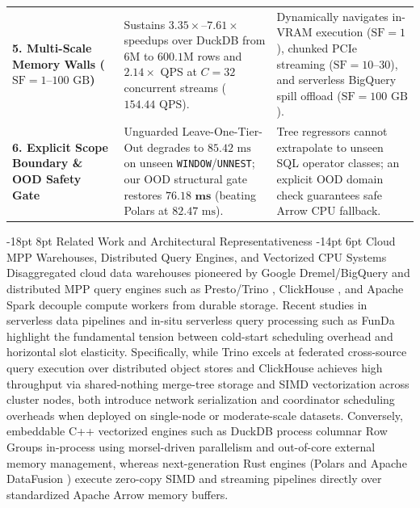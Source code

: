 \documentclass[10pt,a4paper]{article}
\makeatletter
\newenvironment{fitasttable}{%
  \begin{lrbox}{\asttblbox}%
}{%
  \end{lrbox}%
  \sbox{\asttblboxB}{%
    \ifdim\wd\asttblbox>0.96\textwidth
      \resizebox{0.96\textwidth}{!}{\usebox{\asttblbox}}%
    \else
      \usebox{\asttblbox}%
    \fi
  }%
  \ifdim\ht\asttblboxB>0.72\textheight
    \resizebox{!}{0.72\textheight}{\usebox{\asttblboxB}}%
  \else
    \usebox{\asttblboxB}%
  \fi
}
\renewcommand\section{\@startsection{section}{1}{\z@}%
  {-18pt \@plus -4pt \@minus -2pt}%
  {8pt \@plus 2pt}%
  {\normalfont\large\bfseries}}
\renewcommand\subsection{\@startsection{subsection}{2}{\z@}%
  {-14pt \@plus -3pt \@minus -1.5pt}%
  {6pt \@plus 1.5pt}%
  {\normalfont\normalsize\bfseries}}
\makeatother
\begin{document}
\begin{table}[!htbp]
{\begin{fitasttable}
\begin{tabular}{@{}p{2.9cm}p{5.3cm}p{6.8cm}@{}}
\textbf{5. Multi-Scale Memory Walls ($\text{SF}=1\text{--}100\text{ GB}$)} & Sustains $3.35\times\text{--}7.61\times$ speedups over DuckDB from $6\text{M}$ to $600.1\text{M}$ rows and $2.14\times$ QPS at $C=32$ concurrent streams ($154.44\text{ QPS}$). & Dynamically navigates in-VRAM execution ($\text{SF}=1$), chunked PCIe streaming ($\text{SF}=10\text{--}30$), and serverless BigQuery spill offload ($\text{SF}=100\text{ GB}$). \\
\textbf{6. Explicit Scope Boundary \& OOD Safety Gate} & Unguarded Leave-One-Tier-Out degrades to $85.42\text{ ms}$ on unseen \texttt{WINDOW}/\texttt{UNNEST}; our OOD structural gate restores $\mathbf{76.18\text{ ms}}$ (beating Polars at $82.47\text{ ms}$). & Tree regressors cannot extrapolate to unseen SQL operator classes; an explicit OOD domain check guarantees safe Arrow CPU fallback. \\
\bottomrule
\end{tabular}
\end{fitasttable}
}
\end{table}

\section{Related Work and Architectural Representativeness}
\subsection{Cloud MPP Warehouses, Distributed Query Engines, and Vectorized CPU Systems}
Disaggregated cloud data warehouses pioneered by Google Dremel/BigQuery \cite{melnik2010dremel, melnik2020dremel} and distributed MPP query engines such as Presto/Trino \cite{sethi2019presto}, ClickHouse \cite{schulze2024clickhouse}, and Apache Spark \cite{ahmed2020hibench} decouple compute workers from durable storage. Recent studies in serverless data pipelines \cite{shojaee2024serverless} and in-situ serverless query processing such as FunDa \cite{lounissi2025funda} highlight the fundamental tension between cold-start scheduling overhead and horizontal slot elasticity. Specifically, while Trino \cite{sethi2019presto} excels at federated cross-source query execution over distributed object stores and ClickHouse \cite{schulze2024clickhouse} achieves high throughput via shared-nothing merge-tree storage and SIMD vectorization across cluster nodes, both introduce network serialization and coordinator scheduling overheads when deployed on single-node or moderate-scale datasets. Conversely, embeddable C++ vectorized engines such as DuckDB \cite{raasveldt2019duckdb, kuiper2024duckdb_ooc} process columnar Row Groups in-process using morsel-driven parallelism and out-of-core external memory management, whereas next-generation Rust engines (Polars and Apache DataFusion \cite{lamb2024datafusion}) execute zero-copy SIMD and streaming pipelines directly over standardized Apache Arrow memory buffers.
\end{document}
